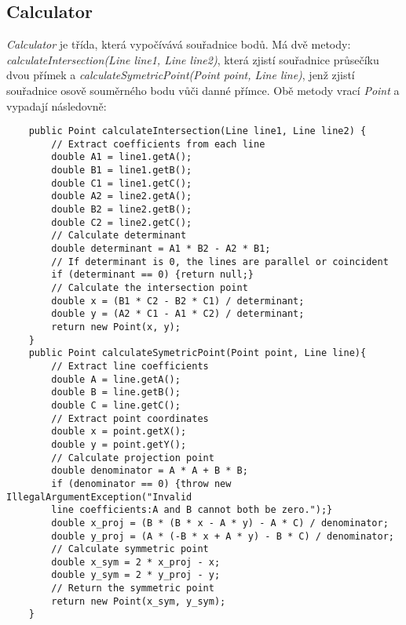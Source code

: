 \subsection{Calculator}
\textit{Calculator} je třída, která vypočívává souřadnice bodů. Má dvě metody: \textit{calculateIntersection(Line line1, Line line2)}\cite{pruseciky}, která zjistí souřadnice průsečíku dvou přímek a \textit{calculateSymetricPoint(Point point, Line line)}\cite{symetrie}, jenž zjistí souřadnice osově souměrného bodu vůči danné přímce. Obě metody vrací \textit{Point} a vypadají následovně:\\
\footnotesize
\begin{verbatim}
    public Point calculateIntersection(Line line1, Line line2) {
        // Extract coefficients from each line
        double A1 = line1.getA();
        double B1 = line1.getB();
        double C1 = line1.getC();
        double A2 = line2.getA();
        double B2 = line2.getB();
        double C2 = line2.getC();
        // Calculate determinant
        double determinant = A1 * B2 - A2 * B1;
        // If determinant is 0, the lines are parallel or coincident
        if (determinant == 0) {return null;}
        // Calculate the intersection point
        double x = (B1 * C2 - B2 * C1) / determinant;
        double y = (A2 * C1 - A1 * C2) / determinant;
        return new Point(x, y);
    }
    public Point calculateSymetricPoint(Point point, Line line){
        // Extract line coefficients
        double A = line.getA();
        double B = line.getB();
        double C = line.getC();
        // Extract point coordinates
        double x = point.getX();
        double y = point.getY();
        // Calculate projection point
        double denominator = A * A + B * B;
        if (denominator == 0) {throw new IllegalArgumentException("Invalid 
        line coefficients:A and B cannot both be zero.");}
        double x_proj = (B * (B * x - A * y) - A * C) / denominator;
        double y_proj = (A * (-B * x + A * y) - B * C) / denominator;
        // Calculate symmetric point
        double x_sym = 2 * x_proj - x;
        double y_sym = 2 * y_proj - y;
        // Return the symmetric point
        return new Point(x_sym, y_sym);
    }
\end{verbatim}
\normalsize




